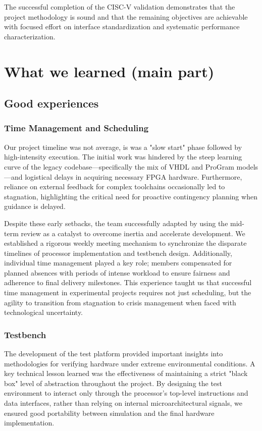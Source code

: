 \documentclass[10pt]{article}
\begin{document}
The successful completion of the CISC-V validation demonstrates that the project methodology is sound and that the remaining objectives are achievable with focused effort on interface standardization and systematic performance characterization.


\section{What we learned (main part)}
\subsection{Good experiences}
\subsubsection{Time Management and Scheduling}
Our project timeline was not average, is was a "slow start" phase followed by high-intensity execution. The initial work was hindered by the steep learning curve of the legacy codebase—specifically the mix of VHDL and ProGram models—and logistical delays in acquiring necessary FPGA hardware. Furthermore, reliance on external feedback for complex toolchains occasionally led to stagnation, highlighting the critical need for proactive contingency planning when guidance is delayed.

Despite these early setbacks, the team successfully adapted by using the mid-term review as a catalyst to overcome inertia and accelerate development. We established a rigorous weekly meeting mechanism to synchronize the disparate timelines of processor implementation and testbench design. Additionally, individual time management played a key role; members compensated for planned absences with periods of intense workload to ensure fairness and adherence to final delivery milestones. This experience taught us that successful time management in experimental projects requires not just scheduling, but the agility to transition from stagnation to crisis management when faced with technological uncertainty.

\subsubsection{Testbench}
The development of the test platform provided important insights into methodologies for verifying hardware under extreme environmental conditions. A key technical lesson learned was the effectiveness of maintaining a strict "black box" level of abstraction throughout the project. By designing the test environment to interact only through the processor's top-level instructions and data interfaces, rather than relying on internal microarchitectural signals, we ensured good portability between simulation and the final hardware implementation.
\end{document}
